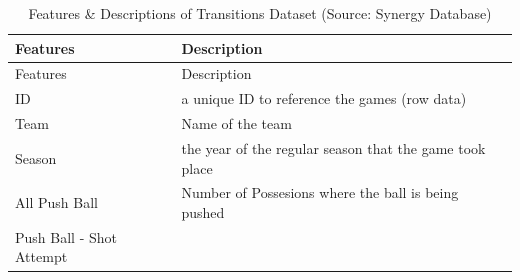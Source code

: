\documentclass[]{book}
\begin{document}
\begin{longtable}[]{@{}ll@{}}
\caption{\label{tab:transitions} Features \& Descriptions of Transitions Dataset (Source: Synergy Database)}\tabularnewline
\toprule
\begin{minipage}[b]{0.32\columnwidth}\raggedright
Features\strut
\end{minipage} & \begin{minipage}[b]{0.62\columnwidth}\raggedright
Description\strut
\end{minipage}\tabularnewline
\midrule
\endfirsthead
\toprule
\begin{minipage}[b]{0.32\columnwidth}\raggedright
Features\strut
\end{minipage} & \begin{minipage}[b]{0.62\columnwidth}\raggedright
Description\strut
\end{minipage}\tabularnewline
\midrule
\endhead
\begin{minipage}[t]{0.32\columnwidth}\raggedright
ID\strut
\end{minipage} & \begin{minipage}[t]{0.62\columnwidth}\raggedright
a unique ID to reference the games (row data)\strut
\end{minipage}\tabularnewline
\begin{minipage}[t]{0.32\columnwidth}\raggedright
Team\strut
\end{minipage} & \begin{minipage}[t]{0.62\columnwidth}\raggedright
Name of the team\strut
\end{minipage}\tabularnewline
\begin{minipage}[t]{0.32\columnwidth}\raggedright
Season\strut
\end{minipage} & \begin{minipage}[t]{0.62\columnwidth}\raggedright
the year of the regular season that the game took place\strut
\end{minipage}\tabularnewline
\begin{minipage}[t]{0.32\columnwidth}\raggedright
All Push Ball\strut
\end{minipage} & \begin{minipage}[t]{0.62\columnwidth}\raggedright
Number of Possesions where the ball is being pushed\strut
\end{minipage}\tabularnewline
\begin{minipage}[t]{0.32\columnwidth}\raggedright
Push Ball - Shot Attempt\strut
\end{minipage} & \begin{minipage}[t]{0.62\columnwidth}\raggedright

\end{minipage}
\end{longtable}
\end{document}
